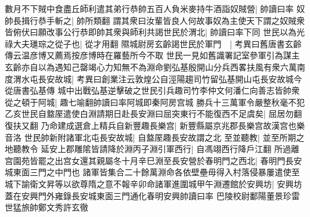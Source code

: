 數月不下賊中食盡丘師利遣其弟行恭帥五百人負米麥持牛酒詣奴賊營|{
	帥讀曰率}
奴帥長揖行恭手斬之|{
	帥所類翻}
謂其衆曰汝輩皆良人何故事奴為主使天下謂之奴賊衆皆俯伏曰願改事公行恭即帥其衆與師利共謁世民於渭北|{
	帥讀曰率下同}
世民以為光祿大夫璡琮之從子也|{
	從才用翻}
隰城尉房玄齡謁世民於軍門　|{
	考異曰舊唐書玄齡傳云温彦博又薦焉按彦博時在羅藝所今不取}
世民一見如舊識署記室參軍引為謀主玄齡亦自以為遇知己罄竭心力知無不為淵命劉弘基殷開山分兵西畧扶風有衆六萬南度渭水屯長安故城|{
	考異曰創業注云敦煌公自涇陽趨司竹留弘基開山屯長安故城今從唐書弘基傳}
城中出戰弘基逆擊破之世民引兵趣司竹李仲文何潘仁向善志皆帥衆從之頓于阿城|{
	趣七喻翻帥讀曰率阿城即秦阿房宫城}
勝兵十三萬軍令嚴整秋毫不犯乙亥世民自盩厔遣使白淵請期日赴長安淵曰屈突東行不能復西不足虞矣|{
	屈居勿翻復扶又翻}
乃命建成選倉上精兵自新豐趣長樂宫|{
	新豐縣屬京兆郡長樂宫故漢宫也樂音洛}
世民帥新附諸軍北屯長安故城|{
	自盩厔趣長安故謂之北}
至並聽教|{
	並至所期之地聽教令}
延安上郡雕隂皆請降於淵丙子淵引軍西行|{
	自馮翊西行降戶江翻}
所過離宫園苑皆罷之出宫女還其親屬冬十月辛巳淵至長安營於春明門之西北|{
	春明門長安城東面三門之中門也}
諸軍皆集合二十餘萬淵命各依壁壘毋得入村落侵暴屢遣使至城下諭衛文昇等以欲尊隋之意不報辛卯命諸軍進圍城甲午淵遷館於安興坊|{
	安興坊蓋在安興門外雍錄長安城東面三門通化春明安興帥讀曰率}
巴陵校尉鄱陽董景珍雷世猛旅帥鄭文秀許玄徹


